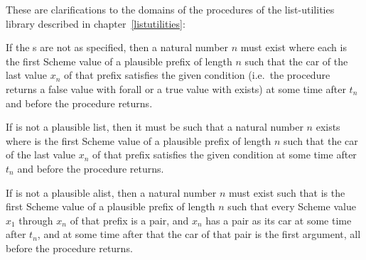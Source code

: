 These are clarifications to the domains of the procedures of the list-utilities
library described in chapter~\ref{listutilities}:

\begin{entry}{%
}


If the s are not as specified, then a natural number $n$ must
exist where each  is the first Scheme value of a plausible
prefix of length $n$ such that the car of the last value $x_n$ of that
prefix satisfies the given condition (i.e.\ the procedure returns a
false value with {\cf forall} or a true value with {\cf exists}) at
some time after $t_n$ and before the procedure returns.
\end{entry}

\begin{entry}{%
}


If  is not a plausible list, then it must be such that a
natural number $n$ exists where  is the first Scheme value of a
plausible prefix of length $n$ such that the car of the last value $x_n$ of that
prefix satisfies the given condition at some time after $t_n$ and before
the procedure returns.
\end{entry}

\begin{entry}{%
}


If  is not a plausible alist, then a natural number $n$ must
exist such that  is the first Scheme value of a plausible
prefix of length $n$ such that every Scheme value $x_1$ through $x_n$
of that prefix is a pair, and $x_n$ has a pair as its car at some time
after $t_n$, and at some time after that the car of that pair is the
first argument, all before the procedure returns.
\end{entry}

